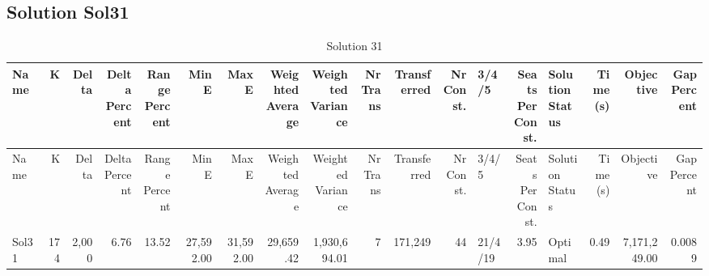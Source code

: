 \documentclass[a4paper]{article}
\begin{document}
\clearpage
\subsection{Solution Sol31}

{\scriptsize
\begin{longtable}{lrrrrrrrrrrrlrlrrr}
\caption{Solution 31}
\\ \toprule
Name &K &Delta &\shortstack{Delta\\Percent} &\shortstack{Range\\Percent} &Min E &Max E &\shortstack{Weighted\\Average} &\shortstack{Weighted\\Variance} &\shortstack{Nr\\Trans} &Transferred &\shortstack{Nr\\Const.} &3/4/5 &\shortstack{Seats\\Per\\Const.} &\shortstack{Solution\\Status} &\shortstack{Time\\(s)} &Objective &\shortstack{Gap\\Percent} \\ \midrule
\endfirsthead
\toprule
Name &K &Delta &\shortstack{Delta\\Percent} &\shortstack{Range\\Percent} &Min E &Max E &\shortstack{Weighted\\Average} &\shortstack{Weighted\\Variance} &\shortstack{Nr\\Trans} &Transferred &\shortstack{Nr\\Const.} &3/4/5 &\shortstack{Seats\\Per\\Const.} &\shortstack{Solution\\Status} &\shortstack{Time\\(s)} &Objective &\shortstack{Gap\\Percent} \\ \midrule
\endhead
\bottomrule
\endfoot
Sol31&174&2,000& 6.76&13.52&27,592.00&31,592.00&29,659.42&1,930,694.01&7&171,249&44&21/4/19& 3.95&Optimal& 0.49&7,171,249.00&0.0089\\ 
\end{longtable}

}
\end{document}
